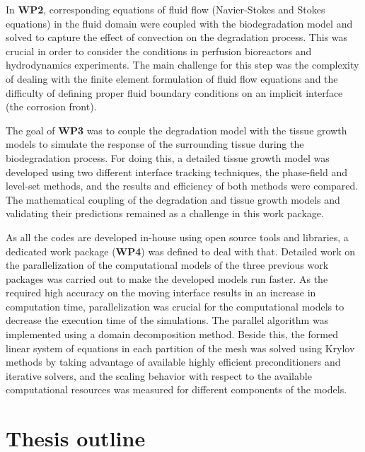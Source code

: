 In \textbf{WP2}, corresponding equations of fluid flow (Navier-Stokes and Stokes equations) in the fluid domain were coupled with the biodegradation model and solved to capture the effect of convection on the degradation process. This was crucial in order to consider the conditions in perfusion bioreactors and hydrodynamics experiments. The main challenge for this step was the complexity of dealing with the finite element formulation of fluid flow equations and the difficulty of defining proper fluid boundary conditions on an implicit interface (the corrosion front).

The goal of \textbf{WP3} was to couple the degradation model with the tissue growth models to simulate the response of the surrounding tissue during the biodegradation process. For doing this, a detailed tissue growth model was developed using two different interface tracking techniques, the phase-field and level-set methods, and the results and efficiency of both methods were compared. The mathematical coupling of the degradation and tissue growth models and validating their predictions remained as a challenge in this work package.

As all the codes are developed in-house using open source tools and libraries, a dedicated work package (\textbf{WP4}) was defined to deal with that. Detailed work on the parallelization of the computational models of the three previous work packages was carried out to make the developed models run faster. As the required high accuracy on the moving interface results in an increase in computation time, parallelization was crucial for the computational models to decrease the execution time of the simulations. The parallel algorithm was implemented using a domain decomposition method. Beside this, the formed linear system of equations in each partition of the mesh was solved using Krylov methods by taking advantage of available highly efficient preconditioners and iterative solvers, and the scaling behavior with respect to the available computational resources was measured for different components of the models.



\section{Thesis outline}


\cleardoublepage

